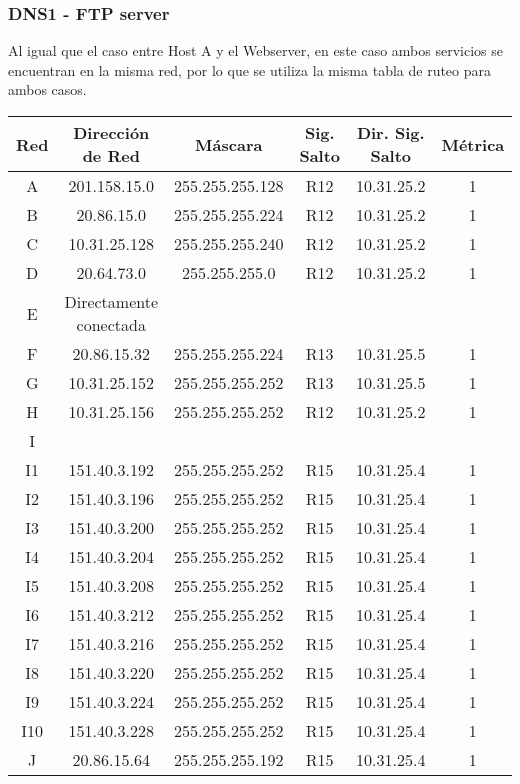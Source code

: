 \subsubsection{DNS1 - FTP server}
Al igual que el caso entre Host A y el Webserver, en este caso ambos servicios se encuentran en la misma red, por lo que se utiliza la misma tabla de ruteo para ambos casos.
\begin{tabular}{|c|c|c|c|c|c|}
	\hline
	Red & Dirección de Red & Máscara & Sig. Salto & Dir. Sig. Salto & Métrica \\
	\hline
	A & 201.158.15.0  & 255.255.255.128 & R12 & 10.31.25.2 & 1\\
	\hline	
	B & 20.86.15.0 & 255.255.255.224 & R12 & 10.31.25.2 & 1\\
	\hline
	C & 10.31.25.128 & 255.255.255.240 & R12 & 10.31.25.2 & 1\\
	\hline
	D & 20.64.73.0 & 255.255.255.0 & R12 & 10.31.25.2 & 1\\
	\hline
	E & Directamente conectada &&&&\\
	\hline
	F & 20.86.15.32 & 255.255.255.224 & R13 & 10.31.25.5 & 1\\
	\hline
	G & 10.31.25.152 & 255.255.255.252 & R13 & 10.31.25.5 & 1\\
	\hline
	H & 10.31.25.156 & 255.255.255.252 & R12 & 10.31.25.2 & 1\\
	\hline
	I &  & & & &\\
	I1 & 151.40.3.192 & 255.255.255.252 & R15 & 10.31.25.4 & 1 \\
	I2 & 151.40.3.196 & 255.255.255.252 & R15 & 10.31.25.4 & 1 \\
 	I3 & 151.40.3.200 & 255.255.255.252 & R15 & 10.31.25.4 & 1 \\
 	I4 & 151.40.3.204 & 255.255.255.252 & R15 & 10.31.25.4 & 1 \\
 	I5 & 151.40.3.208 & 255.255.255.252 & R15 & 10.31.25.4 & 1 \\
 	I6 & 151.40.3.212 & 255.255.255.252 & R15 & 10.31.25.4 & 1 \\
 	I7 & 151.40.3.216 & 255.255.255.252 & R15 & 10.31.25.4 & 1 \\
 	I8 & 151.40.3.220 & 255.255.255.252 & R15 & 10.31.25.4 & 1 \\
 	I9 & 151.40.3.224 & 255.255.255.252 & R15 & 10.31.25.4 & 1 \\
 	I10 & 151.40.3.228 & 255.255.255.252 & R15 & 10.31.25.4 & 1 \\
	\hline
	J & 20.86.15.64 & 255.255.255.192 & R15 & 10.31.25.4 & 1\\

\end{tabular}
